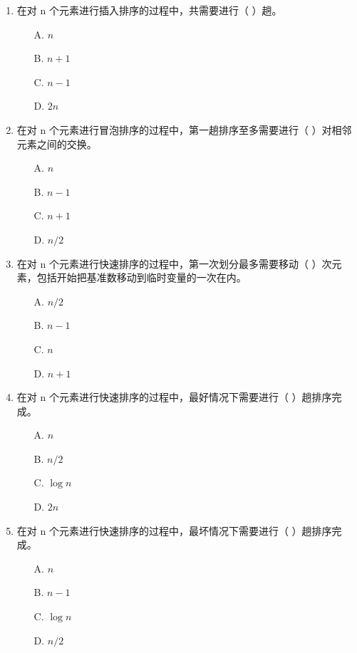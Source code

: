 \documentclass[12pt, a4paper]{article}
\begin{document}
\begin{enumerate}
    \item 在对 n 个元素进行插入排序的过程中，共需要进行（ ）趟。
    \begin{enumerate}
        \item[A.] $n$
        \item[B.] $n+1$
        \item[C.] $n-1$
        \item[D.] $2n$
    \end{enumerate}
    
    \item 在对 n 个元素进行冒泡排序的过程中，第一趟排序至多需要进行（ ）对相邻元素之间的交换。
    \begin{enumerate}
        \item[A.] $n$
        \item[B.] $n-1$
        \item[C.] $n+1$
        \item[D.] $n/2$
    \end{enumerate}
    
    \item 在对 n 个元素进行快速排序的过程中，第一次划分最多需要移动（ ）次元素，包括开始把基准数移动到临时变量的一次在内。
    \begin{enumerate}
        \item[A.] $n/2$
        \item[B.] $n-1$
        \item[C.] $n$
        \item[D.] $n+1$
    \end{enumerate}
    
    \item 在对 n 个元素进行快速排序的过程中，最好情况下需要进行（ ）趟排序完成。
    \begin{enumerate}
        \item[A.] $n$
        \item[B.] $n/2$
        \item[C.] $\log n$
        \item[D.] $2n$
    \end{enumerate}
    
    \item 在对 n 个元素进行快速排序的过程中，最坏情况下需要进行（ ）趟排序完成。
    \begin{enumerate}
        \item[A.] $n$
        \item[B.] $n-1$
        \item[C.] $\log n$
        \item[D.] $n/2$
    \end{enumerate}
    

\end{enumerate}
\end{document}
